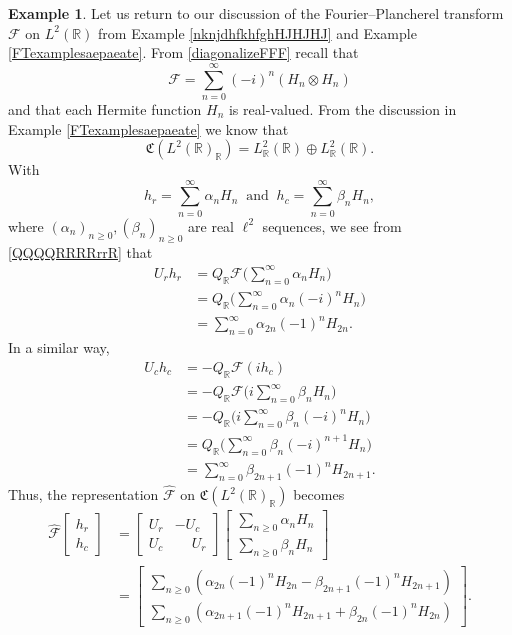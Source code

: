 \documentclass{dis}
\newcommand{\phm}{\phantom{-}}
\theoremstyle{plain}
\theoremstyle{definition}
\newtheorem{Example}[equation]{Example}
\def\R{\mathbb{R}}
\renewcommand{\geq}{\geqslant}
\newcommand{\0}{{\color{lightgray}0}}
\begin{document}
\begin{Example}\label{FTTagain}
Let us return to our discussion of the Fourier--Plancherel transform $\mathcal{F}$ on $L^2(\R)$ from Example \ref{nknjdhfkhfghHJHJHJ} and Example \ref{FTexamplesaepaeate}. From \eqref{diagonalizeFFF} recall that 
$$\mathcal{F} = \sum_{n = 0}^{\infty} (-i)^{n} (H_{n} \otimes H_{n})$$
and that each Hermite function $H_n$ is real-valued. From the discussion in Example \ref{FTexamplesaepaeate} we know that  
$$\mathfrak{C}(L^2(\R)_{\R}) = L^{2}_{\R}(\R) \oplus L^{2}_{\R}(\R).$$
With 
$$h_{r} = \sum_{n = 0}^{\infty} \alpha_{n} H_n \; \; \mbox{and} \; \; h_{c} = \sum_{n = 0}^{\infty} \beta_{n} H_n,$$
where $(\alpha_n)_{n \geq 0}, (\beta_{n})_{n \geq 0}$ are real $\ell^2$ sequences, we see from \eqref{QQQQRRRRrrR} that 
\begin{align*}
U_{r} h_{r} & = Q_{\R} \mathcal{F} \Big(\sum_{n = 0}^{\infty} \alpha_n H_n\Big)\\
& = Q_{\R} \Big(\sum_{n = 0}^{\infty}\alpha_{n} (-i)^n H_n\Big)\\
& = \sum_{n = 0}^{\infty} \alpha_{2n} (-1)^n H_{2n}.
\end{align*}
In a similar way, 
\begin{align*}
U_{c} h_{c} & = -Q_{\R} \mathcal{F}(i h_c)\\
& = -Q_{\R} \mathcal{F}\Big(i\sum_{n = 0}^{\infty} \beta_{n} H_{n}\Big)\\
& = -Q_{\R} \Big(i \sum_{n = 0}^{\infty}\beta_{n} (-i)^n H_{n}\Big)\\
& = Q_{\R} \Big(\sum_{n = 0}^{\infty} \beta_n (-i)^{n + 1} H_n\Big)\\
& = \sum_{n = 0}^{\infty} \beta_{2 n + 1} (-1)^{n} H_{2 n + 1}.
\end{align*}
Thus,  the representation $\widehat{\mathcal{F}}$ on $\mathfrak{C}(L^2(\R)_{\R})$ becomes 
\begin{align*}
\widehat{\mathcal{F}} \begin{bmatrix} h_{r}\\ h_{c}\end{bmatrix} & = \begin{bmatrix} U_{r} & - U_{c}\\ U_{c} & \phm U_{r}\end{bmatrix} \begin{bmatrix} \sum_{n \geq 0} \alpha_n H_n\\ \sum_{n \geq 0} \beta_n H_n\end{bmatrix}\\
& = \begin{bmatrix} \sum_{n \geq 0} (\alpha_{2n} (-1)^n H_{2n}  - \beta_{2 n + 1} (-1)^n H_{2n + 1})\\
 \sum_{n \geq 0} (\alpha_{2n + 1} (-1)^n H_{2n + 1}  + \beta_{2 n} (-1)^n H_{2n})\end{bmatrix}.
\end{align*}
\end{Example}
\end{document}
